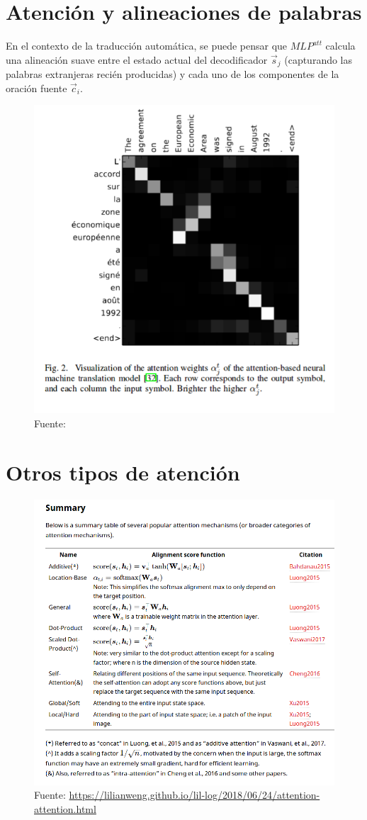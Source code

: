 \section{Atención y alineaciones de palabras}
En el contexto de la traducción automática, se puede pensar que $MLP^{att}$ calcula una alineación suave entre el estado actual del decodificador $\vec{s}_j$ (capturando las palabras extranjeras recién producidas) y cada uno de los componentes de la oración fuente $\vec{c}_i$.

\begin{figure}[h]
  \centering
  \includegraphics[scale=0.28]{pics/attention-alignment.png}
  \caption{Fuente: \cite{cho2015describing}}
\end{figure}


\section{Otros tipos de atención}
\begin{figure}[h]
  \centering
  \includegraphics[scale=0.32]{pics/types_of_attention.png}
  \caption{Fuente: \url{https://lilianweng.github.io/lil-log/2018/06/24/attention-attention.html}}
\end{figure}

